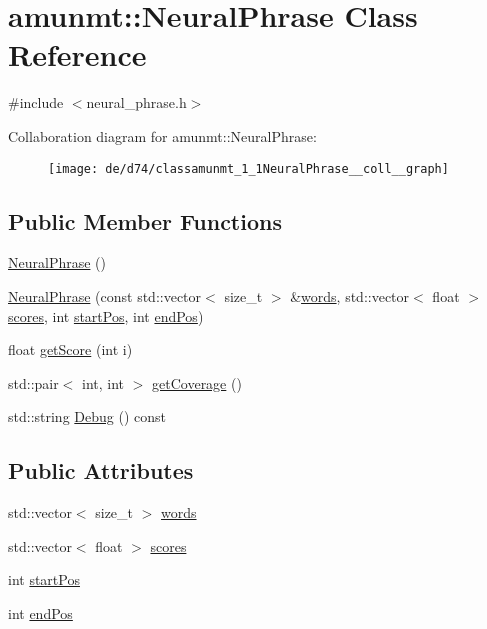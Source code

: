 \hypertarget{classamunmt_1_1NeuralPhrase}{}\section{amunmt\+:\+:Neural\+Phrase Class Reference}
\label{classamunmt_1_1NeuralPhrase}


{\ttfamily \#include $<$neural\+\_\+phrase.\+h$>$}



Collaboration diagram for amunmt\+:\+:Neural\+Phrase\+:
\nopagebreak
\begin{figure}[H]
\begin{center}
\leavevmode
\texttt{[image: de/d74/classamunmt\_1\_1NeuralPhrase\_\_coll\_\_graph]}
\end{center}
\end{figure}
\subsection*{Public Member Functions}
\begin{DoxyCompactItemize}
\item 
\hyperlink{classamunmt_1_1NeuralPhrase_a59964db7f14d82c9025977fa56c8fb6d}{Neural\+Phrase} ()
\item 
\hyperlink{classamunmt_1_1NeuralPhrase_a45837437152f12f6f4eafa76c388e7d4}{Neural\+Phrase} (const std\+::vector$<$ size\+\_\+t $>$ \&\hyperlink{classamunmt_1_1NeuralPhrase_a11ad83191b990eff20e271d8c300cba5}{words}, std\+::vector$<$ float $>$ \hyperlink{classamunmt_1_1NeuralPhrase_a56aa0c73fedf932885d0819024574b8e}{scores}, int \hyperlink{classamunmt_1_1NeuralPhrase_a5df2af7cda11b962e76712de6a555f30}{start\+Pos}, int \hyperlink{classamunmt_1_1NeuralPhrase_a2fb1906a21cf9f011fa6a125a7f3a2d1}{end\+Pos})
\item 
float \hyperlink{classamunmt_1_1NeuralPhrase_a32728077890714218a7adaf86349a5a3}{get\+Score} (int i)
\item 
std\+::pair$<$ int, int $>$ \hyperlink{classamunmt_1_1NeuralPhrase_a9f3ef1aa7227270c1538424fbf66e6ea}{get\+Coverage} ()
\item 
std\+::string \hyperlink{classamunmt_1_1NeuralPhrase_a6a8c5c7b397153ac84384b712e28daf5}{Debug} () const 
\end{DoxyCompactItemize}
\subsection*{Public Attributes}
\begin{DoxyCompactItemize}
\item 
std\+::vector$<$ size\+\_\+t $>$ \hyperlink{classamunmt_1_1NeuralPhrase_a11ad83191b990eff20e271d8c300cba5}{words}
\item 
std\+::vector$<$ float $>$ \hyperlink{classamunmt_1_1NeuralPhrase_a56aa0c73fedf932885d0819024574b8e}{scores}
\item 
int \hyperlink{classamunmt_1_1NeuralPhrase_a5df2af7cda11b962e76712de6a555f30}{start\+Pos}
\item 
int \hyperlink{classamunmt_1_1NeuralPhrase_a2fb1906a21cf9f011fa6a125a7f3a2d1}{end\+Pos}
\end{DoxyCompactItemize}



